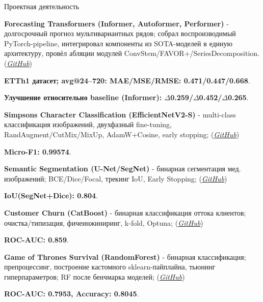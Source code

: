 \begin{rubric}{Проектная деятельность}

\entry*%

    \textbf{Forecasting Transformers (Informer, Autoformer, Performer)} - 
    долгосрочный прогноз мультивариантных рядов; собрал воспроизводимый PyTorch-pipeline, 
    интегрировал компоненты из SOTA-моделей в единую архитектуру, провёл абляции модулей 
    ConvStem/FAVOR+/SeriesDecomposition. 
    (\textit{\href{https://github.com/namenick91/Convformer}{GitHub}})

    \textbf{ETTh1 датасет; avg@24--720: MAE/MSE/RMSE: 0.471/0.447/0.668}. 

    \textbf{Улучшение относительно baseline (Informer): 
    $\Delta$0.259/$\Delta$0.452/$\Delta$0.265}.

\entry*%
	\textbf{Simpsons Character Classification (EfficientNetV2-S)} - 
    multi-class классификация изображений, двухфазный fine-tuning, 
    RandAugment/CutMix/MixUp, AdamW+Cosine, early stopping; 
    (\textit{\href{https://github.com/namenick91/ML-Workshelf\#simpsons-character-classification}{GitHub}})
    
    \textbf{Micro-F1: 0.99574}.

\entry*%
	\textbf{Semantic Segmentation (U-Net/SegNet)} - 
    бинарная сегментация мед. изображений; BCE/Dice/Focal, 
    трекинг IoU, Early Stopping; 
    (\textit{\href{https://github.com/namenick91/ML-Workshelf\#image-segmentation-with-cnns}{GitHub}})
    
    \textbf{IoU(SegNet+Dice): 0.804}.

\entry*%
	\textbf{Customer Churn (CatBoost)} - 
    бинарная классификация оттока клиентов; очистка/типизация, фичеинжиниринг, 
    k-fold, Optuna; 
    (\textit{\href{https://github.com/namenick91/ML-Workshelf\#customer-churn-prediction}{GitHub}})
    
    \textbf{ROC-AUC: 0.859}.

\entry*%
	\textbf{Game of Thrones Survival (RandomForest)} - 
    бинарная классификация; препроцессинг, построение кастомного sklearn-пайплайна,
    тьюнинг гиперпараметров; RF после бенчмарка моделей; 
    (\textit{\href{https://github.com/namenick91/ML-Workshelf\#game-of-thrones-character-survival-prediction}{GitHub}})
    
    \textbf{ROC-AUC: 0.7953, Accuracy: 0.8045}.

\end{rubric}
